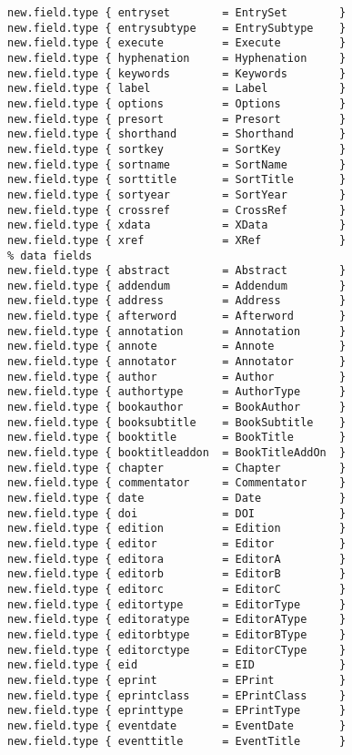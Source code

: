 \documentclass[11pt,a4paper]{scrbook}
\begin{document}
\begin{lstlisting}[language=BibTool]
% special fields
new.field.type { entryset        = EntrySet        }
new.field.type { entrysubtype    = EntrySubtype    }
new.field.type { execute         = Execute         }
new.field.type { hyphenation     = Hyphenation     }
new.field.type { keywords        = Keywords        }
new.field.type { label           = Label           }
new.field.type { options         = Options         }
new.field.type { presort         = Presort         }
new.field.type { shorthand       = Shorthand       }
new.field.type { sortkey         = SortKey         }
new.field.type { sortname        = SortName        }
new.field.type { sorttitle       = SortTitle       }
new.field.type { sortyear        = SortYear        }
new.field.type { crossref        = CrossRef        }
new.field.type { xdata           = XData           }
new.field.type { xref            = XRef            }
% data fields
new.field.type { abstract        = Abstract        }
new.field.type { addendum        = Addendum        }
new.field.type { address         = Address         }
new.field.type { afterword       = Afterword       }
new.field.type { annotation      = Annotation      }
new.field.type { annote          = Annote          }
new.field.type { annotator       = Annotator       }
new.field.type { author          = Author          }
new.field.type { authortype      = AuthorType      }
new.field.type { bookauthor      = BookAuthor      }
new.field.type { booksubtitle    = BookSubtitle    }
new.field.type { booktitle       = BookTitle       }
new.field.type { booktitleaddon  = BookTitleAddOn  }
new.field.type { chapter         = Chapter         }
new.field.type { commentator     = Commentator     }
new.field.type { date            = Date            }
new.field.type { doi             = DOI             }
new.field.type { edition         = Edition         }
new.field.type { editor          = Editor          }
new.field.type { editora         = EditorA         }
new.field.type { editorb         = EditorB         }
new.field.type { editorc         = EditorC         }
new.field.type { editortype      = EditorType      }
new.field.type { editoratype     = EditorAType     }
new.field.type { editorbtype     = EditorBType     }
new.field.type { editorctype     = EditorCType     }
new.field.type { eid             = EID             }
new.field.type { eprint          = EPrint          }
new.field.type { eprintclass     = EPrintClass     }
new.field.type { eprinttype      = EPrintType      }
new.field.type { eventdate       = EventDate       }
new.field.type { eventtitle      = EventTitle      }

\end{lstlisting}
\end{document}
